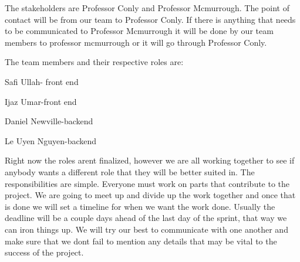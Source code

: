 The stakeholders are Professor Conly and Professor Mcmurrough. The point of contact will be from our team to Professor Conly. If there is anything that needs to be communicated to Professor Mcmurrough it will be done by our team members to professor mcmurrough or it will go through Professor Conly. 

The team members and their respective roles are:

    Safi Ullah- front end
    
    
    Ijaz Umar-front end
    
    
    Daniel Newville-backend
    
    
    Le Uyen Nguyen-backend
    
    Right now the roles arent finalized, however we are all working together to see if anybody wants a different role that they will be better suited in. 
    The responsibilities are simple. Everyone must work on parts that contribute to the project. We are going to meet up and divide up the work together and once that is done we will set a timeline for when we want the work done. Usually the deadline will be a couple days ahead of the last day of the sprint, that way we can iron things up. We will try our best to communicate with one another and make sure that we dont fail to mention any details that may be vital to the success of the project. 